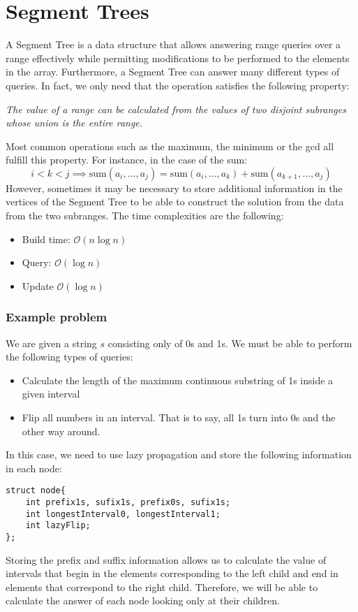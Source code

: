 \newpage
{}

\section{Segment Trees}
A Segment Tree is a data structure that allows answering range queries 
over a range effectively while permitting modifications to
be performed to the elements in the array. 
Furthermore, a Segment Tree can answer many different types of queries.
In fact, we only need that the operation satisfies the following property:
\begin{center}
		\itshape
		The value of a range can be calculated from the values of two
		disjoint subranges whose union is the entire range.
\end{center}
Most common operations such as the maximum, the minimum or the gcd
all fulfill this property.  For instance, in the case of the sum:
\[
		i<k<j \implies \mathrm{sum}(a_i, \dots, a_j) = 
		\mathrm{sum}(a_i, \dots, a_k)+
		\mathrm{sum}(a_{k+1}, \dots, a_j)
\]
However, sometimes it may be necessary to store additional information in 
the vertices of the Segment Tree to be able to construct the solution
from the data from the two subranges.
The time complexities are the following:
\begin{itemize}
		\boldmath
		\item Build time: $\mathcal{O}(n\log n)$ 
		\item Query: $\mathcal{O}( \log n)$
		\item Update $\mathcal{O}( \log n)$
\end{itemize}
\subsubsection*{Example problem}
We are given a string $s$ consisting only of 0s and 1s. We must be able
to perform the following types of queries:
\begin{itemize}
		\setlength{\itemsep}{0pt}
		\item Calculate the length of the maximum continuous substring of 1s
				inside a given interval
		\item Flip all numbers in an interval. That is to say, all 1s turn
				into 0s and the other way around.
\end{itemize}
In this case, we need to use lazy propagation and store the following information
in each node:
\begin{verbatim}
struct node{
	int prefix1s, sufix1s, prefix0s, sufix1s;
	int longestInterval0, longestInterval1;
	int lazyFlip;
};
\end{verbatim}
Storing the prefix and suffix information allows us to calculate the value of
intervals that begin in the elements corresponding to the left child and
end in elements that correspond to the right child. Therefore, we will be able 
to calculate the answer of each node looking only at their children.

